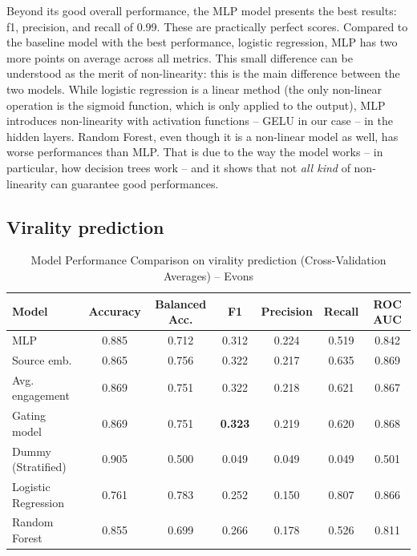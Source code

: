 \documentclass[a4paper,twoside,12pt]{book}
\begin{document}
Beyond its good overall performance, the MLP model presents the best results: f1, precision, and recall of 0.99. These are practically perfect scores. Compared to the baseline model with the best performance, logistic regression, MLP has two more points on average across all metrics. This small difference can be understood as the merit of non-linearity: this is the main difference between the two models. While logistic regression is a linear method (the only non-linear operation is the sigmoid function, which is only applied to the output), MLP introduces non-linearity with activation functions -- GELU in our case -- in the hidden layers. Random Forest, even though it is a non-linear model as well, has worse performances than MLP. That is due to the way the model works -- in particular, how decision trees work -- and it shows that not \textit{all kind} of non-linearity can guarantee good performances.

\FloatBarrier

\subsection{Virality prediction}

\begin{table}[H]
	\centering
	\caption{Model Performance Comparison on virality prediction (Cross-Validation Averages) -- Evons}
	\vspace{0.5em}
	\label{tab:results_evons_virality}
	\begin{tabular}{lcccccc}
		\hline
		\textbf{Model} & \textbf{Accuracy} & \textbf{Balanced Acc.} & \textbf{F1} & \textbf{Precision} & \textbf{Recall} & \textbf{ROC AUC} \\
		\hline
		MLP        & 0.885 & 0.712 & 0.312 & 0.224 & 0.519 & 0.842 \\
		Source emb.     & 0.865 & 0.756 & 0.322 & 0.217 & 0.635 & 0.869 \\
		Avg. engagement     & 0.869 & 0.751 & 0.322 & 0.218 & 0.621 & 0.867 \\
		Gating model  & 0.869 & 0.751 & \textbf{0.323} & 0.219 & 0.620 & 0.868 \\
		\hline
		Dummy (Stratified)        & 0.905 & 0.500 & 0.049 & 0.049 & 0.049 & 0.501 \\
		Logistic Regression       & 0.761 & 0.783 & 0.252 & 0.150 & 0.807 & 0.866 \\
		Random Forest             & 0.855 & 0.699 & 0.266 & 0.178 & 0.526 & 0.811 \\
		\hline
	\end{tabular}
\end{table}
\end{document}
